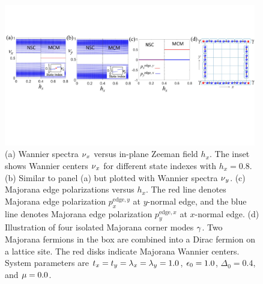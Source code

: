 \documentclass[twocolumn,prl,floatfix,citeautoscript,nofootinbib,superscriptaddress]{revtex4}
\begin{document}
\begin{figure}[t]
\centering\includegraphics[width=0.98\textwidth]{FigS4.pdf}
\caption{(a) Wannier spectra $\protect\nu _{x}$ versus in-plane Zeeman field
$h_{x}$. The inset shows Wannier centers $\protect\nu _{x}$ for different
state indexes with $h_{x}=0.8$. (b) Similar to panel (a) but plotted with
Wannier spectra $\protect\nu _{y}$. (c) Majorana edge polarizations versus $%
h_{x}$. The red line denotes Majorana edge polarization $p_{x}^{\mathrm{edge}%
,y}$ at $y$-normal edge, and the blue line denotes Majorana edge
polarization $p_{y}^{\mathrm{edge},x}$ at $x$-normal edge. (d) Illustration
of four isolated Majorana corner modes $\protect\gamma $. Two Majorana
fermions in the box are combined into a Dirac fermion on a lattice site. The
red disks indicate Majorana Wannier centers. System parameters are $%
t_{x}=t_{y}=\protect\lambda _{x}=\protect\lambda _{y}=1.0$, $\protect%
\epsilon _{0}=1.0$, $\Delta _{0}=0.4$, and $\protect\mu =0.0$.}
\label{FigS4}
\end{figure}
\end{document}
